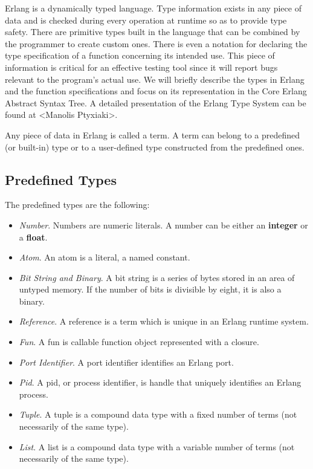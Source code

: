 Erlang is a dynamically typed language. Type information exists in any piece of
data and is checked during every operation at runtime so as to provide type
safety. There are primitive types built in the language that can be combined by
the programmer to create custom ones. There is even a notation for declaring
the type specification of a function concerning its intended use. This piece of
information is critical for an effective testing tool since it will report bugs
relevant to the program's actual use. We will briefly describe the types in
Erlang and the function specifications and focus on its representation in the
Core Erlang Abstract Syntax Tree. A detailed presentation of the Erlang Type
System can be found at <Manolis Ptyxiaki>.

Any piece of data in Erlang is called a term. A term can belong to a predefined
(or built-in) type or to a user-defined type constructed from the predefined
ones. 

\subsection{Predefined Types}\label{sub:predef_types}

The predefined types are the following:

\begin{itemize}
  \item \emph{Number}. Numbers are numeric literals. A number can be either
    an \textbf{integer} or a \textbf{float}.
  \item \emph{Atom}. An atom is a literal, a named constant.
  \item \emph{Bit String and Binary}. A bit string is a series of bytes stored
    in an area of untyped memory. If the number of bits is divisible by eight,
    it is also a binary.
  \item \emph{Reference}. A reference is a term which is unique in an Erlang
    runtime system.
  \item \emph{Fun}. A fun is callable function object represented with a
    closure.
  \item \emph{Port Identifier}. A port identifier identifies an Erlang port.
  \item \emph{Pid}. A pid, or process identifier, is handle that uniquely
    identifies an Erlang process.
  \item \emph{Tuple}. A tuple is a compound data type with a fixed number of
    terms (not necessarily of the same type).
  \item \emph{List}. A list is a compound data type with a variable number of
    terms (not necessarily of the same type).
\end{itemize}

